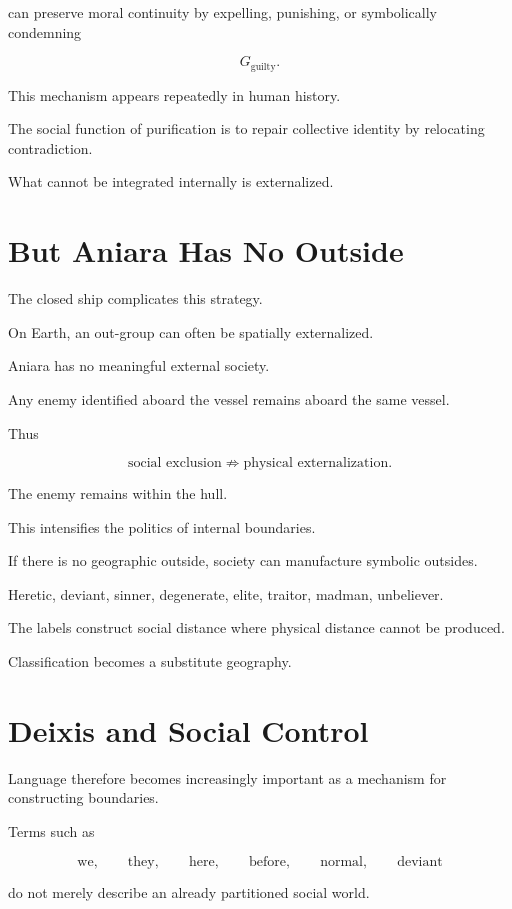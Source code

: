 \documentclass[11pt,oneside]{book}
\theoremstyle{definition}
\theoremstyle{remark}
\begin{document}
can preserve moral continuity by expelling, punishing, or symbolically condemning

\[
G_{\mathrm{guilty}}.
\]

This mechanism appears repeatedly in human history.

The social function of purification is to repair collective identity by relocating contradiction.

What cannot be integrated internally is externalized.

\section{But Aniara Has No Outside}

The closed ship complicates this strategy.

On Earth, an out-group can often be spatially externalized.

Aniara has no meaningful external society.

Any enemy identified aboard the vessel remains aboard the same vessel.

Thus

\[
\text{social exclusion}
\not\Rightarrow
\text{physical externalization}.
\]

The enemy remains within the hull.

This intensifies the politics of internal boundaries.

If there is no geographic outside, society can manufacture symbolic outsides.

Heretic, deviant, sinner, degenerate, elite, traitor, madman, unbeliever.

The labels construct social distance where physical distance cannot be produced.

Classification becomes a substitute geography.

\section{Deixis and Social Control}

Language therefore becomes increasingly important as a mechanism for constructing boundaries.

Terms such as

\[
\text{we},
\qquad
\text{they},
\qquad
\text{here},
\qquad
\text{before},
\qquad
\text{normal},
\qquad
\text{deviant}
\]

do not merely describe an already partitioned social world.
\end{document}
